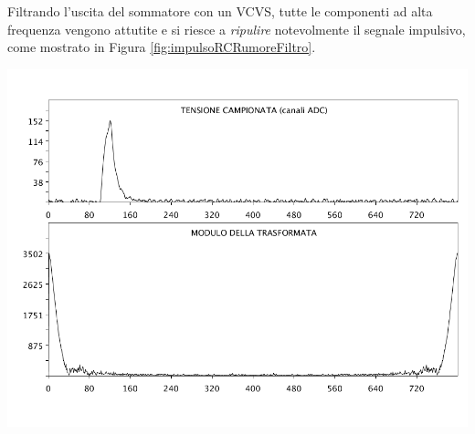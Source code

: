\documentclass[10pt,oneside,a4paper]{article}
\newenvironment{Figure}
  {\par\medskip\noindent\minipage{\linewidth}}
  {\endminipage\par\medskip}
\begin{document}
\begin{multicols}{2}
Filtrando l'uscita del sommatore con un VCVS, tutte le componenti ad alta frequenza vengono attutite e si riesce a \emph{ripulire} notevolmente il segnale impulsivo, come mostrato in Figura \ref{fig:impulsoRCRumoreFiltro}.
\begin{Figure}
	\begin{center}
	\includegraphics[width=0.9\linewidth]{impulsoRCRumoreFiltro}
	\label{fig:impulsoRCRumoreFiltro}
	\end{center}
\end{Figure}

\end{multicols}


%
%
%


\end{document}
